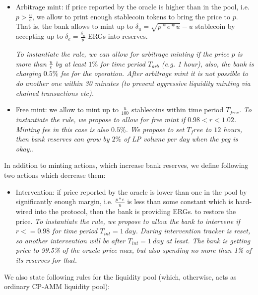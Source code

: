 \documentclass{article}   %
\newcommand{\bc}{ERG}
\newcommand{\sct}{stablecoin}
\begin{document}
\begin{itemize}
  \item{Arbitrage mint: } if price reported by the oracle is higher than in the pool, i.e. $p > \frac{u}{e}$, we allow to print enough \sct{} tokens to bring the price to $p$. That is, the bank allows to mint up to $\delta_u = \sqrt{p*e*u}-u$ \sct{} by accepting up to $\delta_e = \frac{\delta_u}{p}$ \bc{}s into reserves. 

  \em{To instantiate the rule, we can allow for arbitrage minting if the price $p$ is more than $\frac{u}{e}$ by at least $1\%$ for time period $T_{arb}$ (e.g. 1 hour), also, the bank is charging $0.5\%$ fee for the operation. After arbitrage mint it is not possible to do another one within 30 minutes (to prevent aggressive liquidity minting via chained transactions etc).}

  \item{Free mint: } we allow to mint up to $\frac{u}{100}$ \sct{}s within time period $T_{free}$. 
  \em{To instantiate the rule, we propose to allow for free mint if $0.98 < r < 1.02$. Minting fee in this case is also $0.5\%$. We propose to set $T_free$ to $12$ hours, then bank reserves can grow by $2\%$ of LP volume per day when the peg is okay.}.
\end{itemize}  

In addition to minting actions, which increase bank reserves, we define following two actions which decrease them: 

\begin{itemize}
   \item{Intervention: } if price reported by the oracle is lower than one in the pool by significantly enough margin, i.e. $\frac{p*e}{u}$ is less than some constant which is hard-wired into the protocol, then the bank is providing \bc{}s. to restore the price.
   \em{To instantiate the rule, we propose to allow the bank to intervene if $r <= 0.98$ for time period $T_{int} = 1 {\ day}$.
       During intervention tracker is reset, so another intervention will be after $T_{int} = 1 {\ day}$ at least. The bank is getting 
       price to 99.5\% of the oracle price max, but also spending no more than 1\% of its reserves for that.}
\end{itemize}


We also state following rules for the liquidity pool (which, otherwise, acts as ordinary CP-AMM liquidity pool): 
\end{document}
